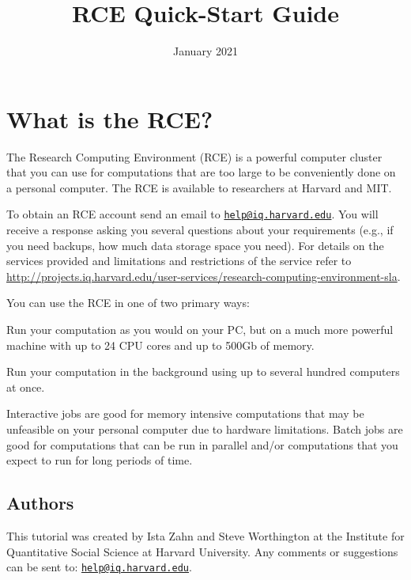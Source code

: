 \documentclass[
]{book}
\title{RCE Quick-Start Guide}
\author{}
\date{\vspace{-2.5em}January 2021}
\providecommand{\tightlist}{%
  \setlength{\itemsep}{0pt}\setlength{\parskip}{0pt}}
\begin{document}
\maketitle

{
\setcounter{tocdepth}{1}
\tableofcontents
}
\hypertarget{what-is-the-rce}{%
\chapter*{What is the RCE?}\label{what-is-the-rce}}

The Research Computing Environment (RCE) is a powerful computer
cluster that you can use for computations that are too large to be
conveniently done on a personal computer. The RCE is available to
researchers at Harvard and MIT.

To obtain an RCE account send an email to
\href{mailto:help@iq.harvard.edu}{\nolinkurl{help@iq.harvard.edu}}. You will
receive a response asking you several questions about your requirements
(e.g., if you need backups, how much data storage space you need). For
details on the services provided and limitations and restrictions of the
service refer to
\url{http://projects.iq.harvard.edu/user-services/research-computing-environment-sla}.

You can use the RCE in one of two primary ways:

\begin{description}
\tightlist
\item[\textbf{Interactive jobs}]
Run your computation as you would on your PC, but on a much more
powerful machine with up to 24 CPU cores and up to 500Gb of memory.
\item[\textbf{Batch jobs}]
Run your computation in the background using up to several hundred
computers at once.
\end{description}

Interactive jobs are good for memory intensive computations that may be
unfeasible on your personal computer due to hardware limitations. Batch
jobs are good for computations that can be run in parallel and/or
computations that you expect to run for long periods of time.

\hypertarget{authors}{%
\section*{Authors}\label{authors}}

This tutorial was created by Ista Zahn and Steve Worthington at the Institute for Quantitative Social Science at Harvard University. Any comments or suggestions can be sent to: \href{mailto:help@iq.harvard.edu}{\nolinkurl{help@iq.harvard.edu}}.
\end{document}
